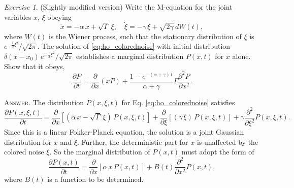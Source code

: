 \documentclass{book}
\numberwithin{equation}{section}
\theoremstyle{plain}
\theoremstyle{definition}
\theoremstyle{remark}
\newtheorem{exercise}{Exercise}
\newcommand{\answer}[1]{{\color{DarkBlue}\footnotesize \textsc{Answer.} #1}}
\begin{document}
\begin{exercise}
  (Slightly modified version)
  Write the M-equation for the joint variables $x$, $\xi$ obeying
  \begin{equation}
  \dot x = -\alpha \, x + \sqrt{\Gamma} \, \xi,
  \quad
  \dot \xi = -\gamma \, \xi + \sqrt{2 \gamma} \, d W(t),
  \label{eq:ho_colorednoise}
  \end{equation}
  where $W(t)$ is the Wiener process,
  such that the stationary distribution of $\xi$
  is $e^{-\frac{1}{2}\xi^2}/\sqrt{2\pi}$.
  The solution of \eqref{eq:ho_colorednoise} with initial distribution
  $\delta(x - x_0) \, e^{-\frac{1}{2}\xi^2}/\sqrt{2\pi}$
  establishes a marginal distribution $P(x, t)$
  for $x$ alone. Show that it obeys,
  \begin{equation}
  \frac{ \partial P } { \partial t } = \frac{ \partial } { \partial x } (x P)
  +
  \frac{ 1 - e^{-(\alpha + \gamma) \, t} } {\alpha + \gamma} \Gamma
  \frac{ \partial^2 P } { \partial x^2 }.
  \label{eq:ho_colorednoise_Px}
  \end{equation}

  \answer{
    The distribution $P(x, \xi, t)$ for
    Eq. \eqref{eq:ho_colorednoise} satisfies
    $$
    \frac{ \partial P(x, \xi, t) } { \partial t }
    =
    \frac{ \partial } { \partial x }
    \left[
      \left( \alpha \, x - \sqrt{\Gamma} \, \xi \right) \, P(x, \xi, t)
    \right]
    +
    \frac{ \partial } { \partial \xi }
    \left[
      (\gamma \, \xi ) \, P(x, \xi, t)
    \right]
    +
    \gamma
    \frac{ \partial^2 } { \partial \xi^2} P(x, \xi, t).
    $$
    Since this is a linear Fokker-Planck equation,
    the solution is a joint Gaussian distribution
    for $x$ and $\xi$.
    Further, the deterministic part for $x$
    is unaffected by the colored noise $\xi$.
    So the marginal distribution of $P(x, t)$
    must adopt the form of
    \begin{equation}
    \frac{ \partial P(x, t) } { \partial t }
    =
    \frac{ \partial } { \partial x }
    \left[
      \alpha \, x \, P(x, t)
    \right]
    +
    B(t)
    \frac{ \partial^2 } { \partial x^2} P(x, t),
    \label{eq:ho_colorednoise_Px1}
    \end{equation}
    where $B(t)$
    is a function to be determined.

}
\end{exercise}
\end{document}
